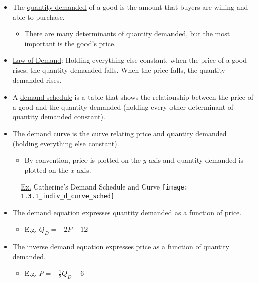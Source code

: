 	\begin{itemize}

	\item The \underline{quantity demanded} of a good is the amount that buyers are willing and able to purchase.
	
		\begin{itemize}
		
		\item There are many determinants of quantity demanded, but the most important is the good's price.
		
		\end{itemize}
		
	\item \underline{Law of Demand}: Holding everything else constant, when the price of a good rises, the quantity demanded falls. When the price falls, the quantity demanded rises.
	
	\item A \underline{demand schedule} is a table that shows the relationship between the price of a good and the quantity demanded (holding every other determinant of quantity demanded constant).
	
	\item The \underline{demand curve} is the curve relating price and quantity demanded (holding everything else constant).
	
		\begin{itemize}
		
		\item By convention, price is plotted on the $y$-axis and quantity demanded is plotted on the $x$-axis.
		
		\end{itemize}

	\end{itemize}
	
	\begin{figure}[h]
	\underline{Ex.} Catherine's Demand Schedule and Curve
	\centering
	\texttt{[image: 1.3.1\_indiv\_d\_curve\_sched]}
	\end{figure}
	
	\begin{itemize}
	
	\item The \underline{demand equation} expresses quantity demanded as a function of price.
	
		\begin{itemize}
		
		\item E.g. $Q_D = -2P + 12$
		
		\end{itemize}
		
	\item The \underline{inverse demand equation} expresses price as a function of quantity demanded.
	
		\begin{itemize}
		
		\item E.g. $P = -\frac{1}{2}Q_D + 6$
		
		\end{itemize}
		
	\end{itemize}
	
